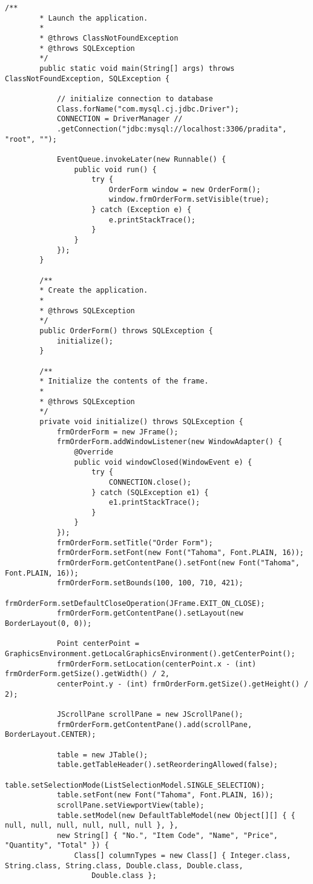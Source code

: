 \begin{lstlisting}[style=JavaStyle]
		/**
		* Launch the application.
		* 
		* @throws ClassNotFoundException
		* @throws SQLException
		*/
		public static void main(String[] args) throws ClassNotFoundException, SQLException {
			
			// initialize connection to database
			Class.forName("com.mysql.cj.jdbc.Driver");
			CONNECTION = DriverManager //
			.getConnection("jdbc:mysql://localhost:3306/pradita", "root", "");
			
			EventQueue.invokeLater(new Runnable() {
				public void run() {
					try {
						OrderForm window = new OrderForm();
						window.frmOrderForm.setVisible(true);
					} catch (Exception e) {
						e.printStackTrace();
					}
				}
			});
		}
		
		/**
		* Create the application.
		* 
		* @throws SQLException
		*/
		public OrderForm() throws SQLException {
			initialize();
		}
		
		/**
		* Initialize the contents of the frame.
		* 
		* @throws SQLException
		*/
		private void initialize() throws SQLException {
			frmOrderForm = new JFrame();
			frmOrderForm.addWindowListener(new WindowAdapter() {
				@Override
				public void windowClosed(WindowEvent e) {
					try {
						CONNECTION.close();
					} catch (SQLException e1) {
						e1.printStackTrace();
					}
				}
			});
			frmOrderForm.setTitle("Order Form");
			frmOrderForm.setFont(new Font("Tahoma", Font.PLAIN, 16));
			frmOrderForm.getContentPane().setFont(new Font("Tahoma", Font.PLAIN, 16));
			frmOrderForm.setBounds(100, 100, 710, 421);
			frmOrderForm.setDefaultCloseOperation(JFrame.EXIT_ON_CLOSE);
			frmOrderForm.getContentPane().setLayout(new BorderLayout(0, 0));
			
			Point centerPoint = GraphicsEnvironment.getLocalGraphicsEnvironment().getCenterPoint();
			frmOrderForm.setLocation(centerPoint.x - (int) frmOrderForm.getSize().getWidth() / 2,
			centerPoint.y - (int) frmOrderForm.getSize().getHeight() / 2);
			
			JScrollPane scrollPane = new JScrollPane();
			frmOrderForm.getContentPane().add(scrollPane, BorderLayout.CENTER);
			
			table = new JTable();
			table.getTableHeader().setReorderingAllowed(false);
			table.setSelectionMode(ListSelectionModel.SINGLE_SELECTION);
			table.setFont(new Font("Tahoma", Font.PLAIN, 16));
			scrollPane.setViewportView(table);
			table.setModel(new DefaultTableModel(new Object[][] { { null, null, null, null, null, null }, },
			new String[] { "No.", "Item Code", "Name", "Price", "Quantity", "Total" }) {
				Class[] columnTypes = new Class[] { Integer.class, String.class, String.class, Double.class, Double.class,
					Double.class };
				

\end{lstlisting}
